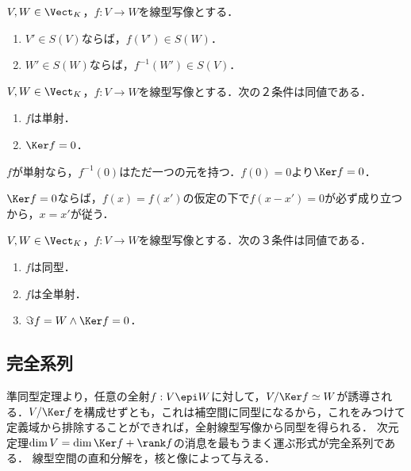 \documentclass[uplatex, dvipdfmx]{jsreport}
\begin{document}
\begin{proposition}
    $V,W\in\Vect_K$，$f:V\to W$を線型写像とする．
    \begin{enumerate}
        \item $V'\in S(V)$ならば，$f(V')\in S(W)$．
        \item $W'\in S(W)$ならば，$f^{-1}(W')\in S(V)$．
    \end{enumerate}
\end{proposition}


\begin{proposition}[単射の特徴付け]\label{prop-characterization-of-monos-in-terms-of-Kernel}
    $V,W\in\Vect_K$，$f:V\to W$を線型写像とする．次の２条件は同値である．
    \begin{enumerate}
        \item $f$は単射．
        \item $\Ker f=0$．
    \end{enumerate}
\end{proposition}
\begin{Proof}
    $f$が単射なら，$f^{-1}(0)$はただ一つの元を持つ．$f(0)=0$より$\Ker f=0$．

    $\Ker f=0$ならば，$f(x)=f(x')$の仮定の下で$f(x-x')=0$が必ず成り立つから，$x=x'$が従う．
\end{Proof}

\begin{corollary}[可逆性と全単射は同値]\label{cor-invertible-if-全単射}
    $V,W\in\Vect_K$，$f:V\to W$を線型写像とする．次の３条件は同値である．
    \begin{enumerate}
        \item $f$は同型．
        \item $f$は全単射．
        \item $\Im f=W\land\Ker f=0$．
    \end{enumerate}
\end{corollary}

\subsection{完全系列}

\begin{tcolorbox}[colframe=ForestGreen, colback=ForestGreen!10!white,breakable,colbacktitle=ForestGreen!40!white,coltitle=black,fonttitle=\bfseries\sffamily,
title=線形写像の全射は極めて奇妙な性質を持つ]
    準同型定理より，任意の全射$f:V\epi W$に対して，$V/\Ker f\simeq W$が誘導される．$V/\Ker f$を構成せずとも，これは補空間に同型になるから，これをみつけて定義域から排除することができれば，全射線型写像から同型を得られる．
    次元定理$\dim V=\dim\Ker f+\rank f$の消息を最もうまく運ぶ形式が完全系列である．
    線型空間の直和分解を，核と像によって与える．
\end{tcolorbox}
\end{document}
